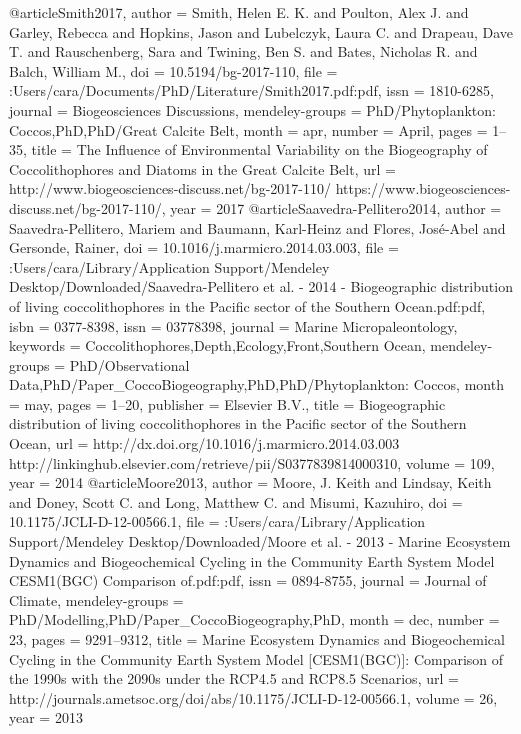 @article{Smith2017,
author = {Smith, Helen E. K. and Poulton, Alex J. and Garley, Rebecca and Hopkins, Jason and Lubelczyk, Laura C. and Drapeau, Dave T. and Rauschenberg, Sara and Twining, Ben S. and Bates, Nicholas R. and Balch, William M.},
doi = {10.5194/bg-2017-110},
file = {:Users/cara/Documents/PhD/Literature/Smith2017.pdf:pdf},
issn = {1810-6285},
journal = {Biogeosciences Discussions},
mendeley-groups = {PhD/Phytoplankton: Coccos,PhD,PhD/Great Calcite Belt},
month = {apr},
number = {April},
pages = {1--35},
title = {{The Influence of Environmental Variability on the Biogeography of Coccolithophores and Diatoms in the Great Calcite Belt}},
url = {http://www.biogeosciences-discuss.net/bg-2017-110/ https://www.biogeosciences-discuss.net/bg-2017-110/},
year = {2017}
}
@article{Saavedra-Pellitero2014,
author = {Saavedra-Pellitero, Mariem and Baumann, Karl-Heinz and Flores, Jos{\'{e}}-Abel and Gersonde, Rainer},
doi = {10.1016/j.marmicro.2014.03.003},
file = {:Users/cara/Library/Application Support/Mendeley Desktop/Downloaded/Saavedra-Pellitero et al. - 2014 - Biogeographic distribution of living coccolithophores in the Pacific sector of the Southern Ocean.pdf:pdf},
isbn = {0377-8398},
issn = {03778398},
journal = {Marine Micropaleontology},
keywords = {Coccolithophores,Depth,Ecology,Front,Southern Ocean},
mendeley-groups = {PhD/Observational Data,PhD/Paper{\_}CoccoBiogeography,PhD,PhD/Phytoplankton: Coccos},
month = {may},
pages = {1--20},
publisher = {Elsevier B.V.},
title = {{Biogeographic distribution of living coccolithophores in the Pacific sector of the Southern Ocean}},
url = {http://dx.doi.org/10.1016/j.marmicro.2014.03.003 http://linkinghub.elsevier.com/retrieve/pii/S0377839814000310},
volume = {109},
year = {2014}
}
@article{Moore2013,
author = {Moore, J. Keith and Lindsay, Keith and Doney, Scott C. and Long, Matthew C. and Misumi, Kazuhiro},
doi = {10.1175/JCLI-D-12-00566.1},
file = {:Users/cara/Library/Application Support/Mendeley Desktop/Downloaded/Moore et al. - 2013 - Marine Ecosystem Dynamics and Biogeochemical Cycling in the Community Earth System Model CESM1(BGC) Comparison of.pdf:pdf},
issn = {0894-8755},
journal = {Journal of Climate},
mendeley-groups = {PhD/Modelling,PhD/Paper{\_}CoccoBiogeography,PhD},
month = {dec},
number = {23},
pages = {9291--9312},
title = {{Marine Ecosystem Dynamics and Biogeochemical Cycling in the Community Earth System Model [CESM1(BGC)]: Comparison of the 1990s with the 2090s under the RCP4.5 and RCP8.5 Scenarios}},
url = {http://journals.ametsoc.org/doi/abs/10.1175/JCLI-D-12-00566.1},
volume = {26},
year = {2013}
}

